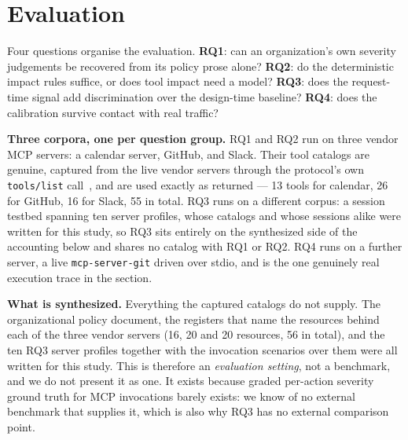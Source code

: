 %
%
%
\section{Evaluation}
\label{sec:eval}

Four questions organise the evaluation. \textbf{RQ1}: can an organization's own
severity judgements be recovered from its policy prose alone? \textbf{RQ2}: do
the deterministic impact rules suffice, or does tool impact need a model?
\textbf{RQ3}: does the request-time signal add discrimination over the
design-time baseline? \textbf{RQ4}: does the calibration survive contact with
real traffic?

\textbf{Three corpora, one per question group.} RQ1 and RQ2 run on three vendor
MCP servers: a calendar server, GitHub, and Slack. Their tool catalogs are
genuine, captured from the live vendor servers through the protocol's own
\texttt{tools/list} call~\cite{mcp2026spec}, and are used exactly as returned
--- 13 tools for calendar, 26 for GitHub, 16 for Slack, 55 in total. RQ3 runs on
a different corpus: a session testbed spanning ten server profiles, whose
catalogs and whose sessions alike were written for this study, so RQ3 sits
entirely on the synthesized side of the accounting below and shares no catalog
with RQ1 or RQ2. RQ4 runs on a further server, a live \texttt{mcp-server-git}
driven over stdio, and is the one genuinely real execution trace in the section.

\textbf{What is synthesized.} Everything the captured catalogs do not supply.
The organizational policy document, the registers that name the resources behind
each of the three vendor servers (16, 20 and 20 resources, 56 in total), and the
ten RQ3 server profiles together with the invocation scenarios over them were
all written for this study. This is therefore an \emph{evaluation setting}, not
a benchmark, and we do not present it as one. It exists because graded
per-action severity ground truth for MCP invocations barely exists: we know of
no external benchmark that supplies it, which is also why RQ3 has no external
comparison point.

